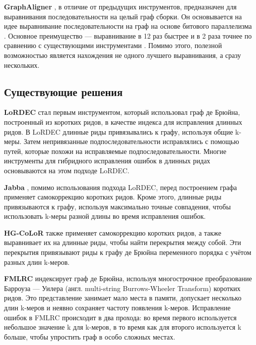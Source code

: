 \documentclass[14pt]{matmex-diploma-custom}
\begin{document}
\textbf{GraphAligner} \cite{art:rautiainen2020graphaligner}, в отличие от предыдущих инструментов, предназначен для выравнивания последовательности на целый граф сборки. Он основывается на идее выравнивание последовательности на граф на основе битового параллелизма \cite{art:bpstga}. Основное преимущество --- выравнивание в 12 раз быстрее и в 2 раза точнее по сравнению с существующими инструментами \cite{art:rautiainen2020graphaligner}. Помимо этого, полезной возможностью является нахождения не одного лучшего выравнивания, а сразу нескольких.


\subsection{Существующие решения}
\textbf{LoRDEC} \cite{art:salmela2014lordec} стал первым инструментом, который использовал граф де Брюйна, построенный из коротких ридов, в качестве индекса для исправления длинных ридов. В LoRDEC длинные риды привязывались к графу, используя общие k-меры. Затем непривязанные подпоследовательности исправлялись с помощью путей, которые похожи на исправляемые подпоследовательности. Многие инструменты для гибридного исправления ошибок в длинных ридах основываются на этом подходе LoRDEC.

\textbf{Jabba} \cite{art:miclotte2016jabba}, помимо использования подхода LoRDEC, перед построением графа применяет самокоррекцию коротких ридов. Кроме этого, длинные риды привязываются к графу, используя максимально точные совпадения, чтобы использовать k-меры разной длины во время исправления ошибок.

\textbf{HG-CoLoR} \cite{art:morisse2018hybrid} также применяет самокоррекцию коротких ридов, а также выравнивает их на длинные риды, чтобы найти перекрытия между собой. Эти перекрытия привязывают риды к графу де Брюйна переменного порядка с учётом разных длин k-меров.

\textbf{FMLRC} \cite{art:wang2018fmlrc} индексирует граф де Брюйна, используя многострочное преобразование Барроуза — Уилера (англ. multi-string Burrows-Wheeler Transform) коротких ридов. Это представление занимает мало места в памяти, допускает несколько длин k-меров и неявно сохраняет частоту появления k-меров. Исправление ошибок в FMLRC происходит в два прохода: во время первого используется небольшое значение k для k-меров, в то время как для второго используется k больше, чтобы упростить граф в особо сложных местах.
\end{document}
